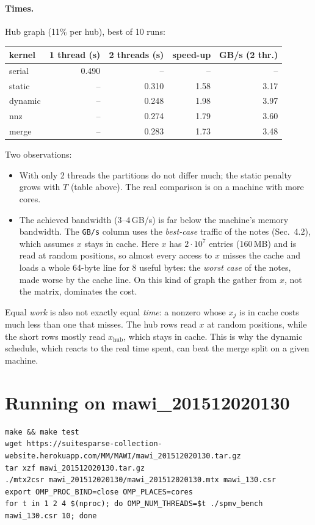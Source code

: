 \documentclass[11pt,a4paper]{article}
\begin{document}
\paragraph{Times.} Hub graph (11\% per hub), best of 10 runs:
\begin{center}
\small
\begin{tabular}{@{}lrrrr@{}}
\toprule
kernel & 1 thread (s) & 2 threads (s) & speed-up & GB/s (2 thr.) \\ \midrule
serial  & 0.490 & --    & --   & --   \\
static  & --    & 0.310 & 1.58 & 3.17 \\
dynamic & --    & 0.248 & 1.98 & 3.97 \\
nnz     & --    & 0.274 & 1.79 & 3.60 \\
merge   & --    & 0.283 & 1.73 & 3.48 \\
\bottomrule
\end{tabular}
\end{center}
Two observations:
\begin{itemize}
  \item With only 2 threads the partitions do not differ much; the static penalty grows
        with $T$ (table above). The real comparison is on a machine with more cores.
  \item The achieved bandwidth (3--4\,GB/s) is far below the machine's memory bandwidth.
        The \texttt{GB/s} column uses the \emph{best-case} traffic of the notes (Sec.~4.2),
        which assumes $x$ stays in cache. Here $x$ has $2\cdot10^7$ entries (160\,MB) and is
        read at random positions, so almost every access to $x$ misses the cache and loads a
        whole 64-byte line for 8 useful bytes: the \emph{worst case} of the notes, made
        worse by the cache line. On this kind of graph the gather from $x$, not the
        matrix, dominates the cost.
\end{itemize}

Equal \emph{work} is also not exactly equal \emph{time}: a nonzero whose $x_j$ is in cache
costs much less than one that misses. The hub rows read $x$ at random positions, while the
short rows mostly read $x_{\text{hub}}$, which stays in cache. This is why the dynamic
schedule, which reacts to the real time spent, can beat the merge split on a given machine.

\section{Running on mawi\_201512020130}
\begin{lstlisting}[style=sh]
make && make test
wget https://suitesparse-collection-website.herokuapp.com/MM/MAWI/mawi_201512020130.tar.gz
tar xzf mawi_201512020130.tar.gz
./mtx2csr mawi_201512020130/mawi_201512020130.mtx mawi_130.csr
export OMP_PROC_BIND=close OMP_PLACES=cores
for t in 1 2 4 $(nproc); do OMP_NUM_THREADS=$t ./spmv_bench mawi_130.csr 10; done
\end{lstlisting}
\end{document}
